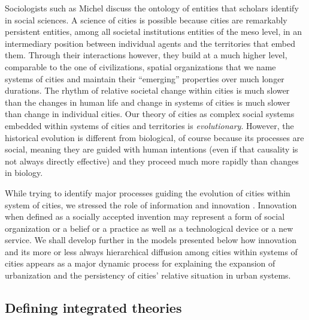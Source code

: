 \documentclass[10pt]{article}
\begin{document}
Sociologists such as Michel \cite{grossetti2020matiere} discuss the ontology of entities that scholars identify in social sciences. A science of cities is possible because cities are remarkably persistent entities, among all societal institutions entities of the meso level, in an intermediary position between individual agents and the territories that embed them. Through their interactions however, they build at a much higher level, comparable to the one of civilizations, spatial organizations that we name systems of cities and maintain their ``emerging'' properties over much longer durations. The rhythm of relative societal change within cities is much slower than the changes in human life and change in systems of cities is much slower than change in individual cities. Our theory of cities as complex social systems embedded within systems of cities and territories is \emph{evolutionary}. However, the historical evolution is different from biological, of course because its processes are social, meaning they are guided with human intentions (even if that causality is not always directly effective) and they proceed much more rapidly than changes in biology.

While trying to identify major processes guiding the evolution of cities within system of cities, we stressed the role of information and innovation \citep{lane2009complexity}. Innovation when defined as a socially accepted invention may represent a form of social organization or a belief or a practice as well as a technological device or a new service. We shall develop further in the models presented below how innovation and its more or less always hierarchical diffusion among cities within systems of cities appears as a major dynamic process for explaining the expansion of urbanization and the persistency of cities’ relative situation in urban systems.


\subsection{Defining integrated theories}
\end{document}
